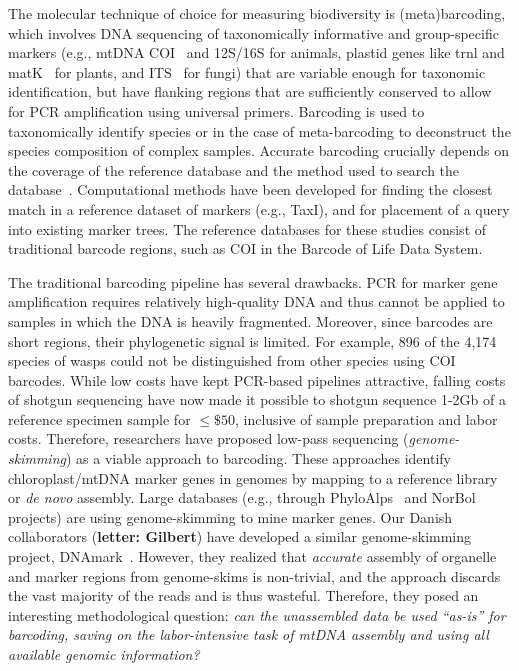 The molecular
technique of choice for measuring biodiversity is
(meta)barcoding\cite{Hebert2003,Savolainen2005,Taberlet2012}, which
involves DNA sequencing of taxonomically informative and
group-specific markers (e.g., mtDNA COI~\cite{Seifert2007,Hebert2003}
and 12S/16S \cite{Vences2005} for animals, plastid genes like trnl and
matK~\cite{Hollingsworth2009} for plants, and ITS~\cite{Schoch2012}
for fungi) that are variable enough for taxonomic identification, but
have flanking regions that are sufficiently conserved to allow for PCR
amplification using universal primers. Barcoding is used to
taxonomically identify species or in the case of meta-barcoding to
deconstruct the species composition of complex samples.  
Accurate
barcoding crucially depends on the coverage of the reference database and the method used
to search the  database~\cite{Taberlet2012}.
Computational methods have been developed for finding the closest match in a reference
dataset of markers (e.g., TaxI\cite{taxl}), and for placement of a
query into existing marker trees\cite{epa,pplacer}. The reference databases for these studies consist of traditional barcode regions, such as COI in the Barcode of
Life Data System\cite{BOLD}.  

The traditional barcoding
pipeline has several drawbacks.  PCR for marker gene amplification requires relatively high-quality DNA and thus cannot be applied to samples in which the DNA is heavily fragmented.  Moreover,
since barcodes are short regions, their phylogenetic signal is limited\cite{Hickerson2006b}.  For
example, 896 of the 4,174 species of wasps could not be
distinguished from other species using COI barcodes\cite{Quicke2012}.
While low costs have kept PCR-based pipelines attractive, falling
costs of shotgun sequencing have now made it possible to shotgun
sequence 1-2Gb of a reference specimen sample for 
$\le\$50$, inclusive of sample preparation and labor costs.
Therefore, researchers have proposed low-pass sequencing (\emph{genome-skimming}) as
a viable approach to
barcoding\cite{Coissac2016}. These approaches identify chloroplast/mtDNA marker genes in genomes by mapping to a reference library or \emph{de novo} assembly\cite{Liu2013}. 
Large 
databases (e.g., through PhyloAlps~\cite{PhyloAlps} and
 NorBol~\cite{NorBol} projects) are using genome-skimming to mine marker genes. 
Our Danish collaborators ({\bf letter: Gilbert}) have developed a similar genome-skimming project, DNAmark~\cite{DNAmark}. However, they realized that {\em accurate} assembly of organelle and
marker regions from genome-skims is non-trivial, and the approach discards the vast majority of the reads and is thus
wasteful.  Therefore, they posed an interesting methodological
question: \emph{can the unassembled data be used ``as-is'' for barcoding, saving on the labor-intensive task of mtDNA assembly and using all available genomic information?}

